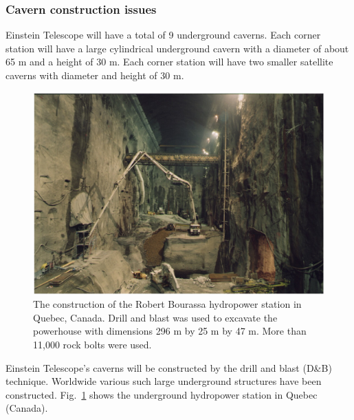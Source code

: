 \FloatBarrier
\subsubsection*{Cavern construction issues}

Einstein Telescope will have a total of 9 underground caverns. Each corner station
will have a large cylindrical underground cavern with a diameter of about 65 m and a
height of 30 m. Each corner station will have two smaller satellite caverns
with diameter and height of 30 m.

\begin{figure}[htbp!]
\centering
\includegraphics[width=12cm]{./Sec_SiteInfra/Figures/station.jpg}
\caption{The construction of the Robert Bourassa hydropower station in Quebec, Canada. 
Drill and blast was used to excavate the powerhouse with dimensions 296 m by
25 m by 47 m. More than 11,000 rock bolts were used.}
\label{fig:station}
\end{figure}
Einstein Telescope's caverns will be constructed by the drill and blast (D\&B) technique. 
Worldwide various such large underground
structures have been constructed. Fig.~\ref{fig:station} shows the underground
hydropower station in Quebec (Canada). 

